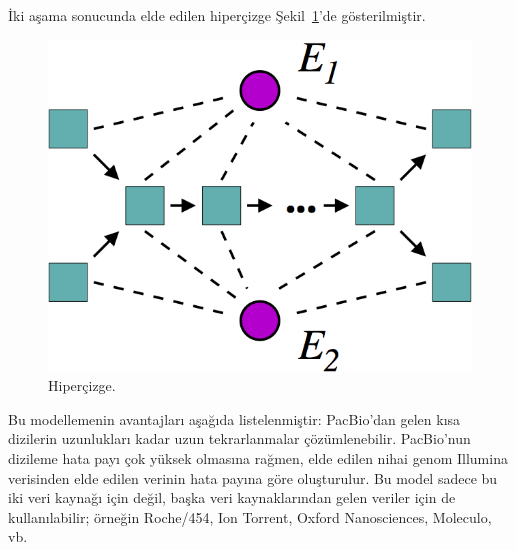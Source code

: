 İki aşama sonucunda elde edilen hiperçizge Şekil~\ref{fig:hypergraph}'de gösterilmiştir.

\begin{figure}[htb]
  \begin{center}
    \includegraphics[scale=0.4]{hypergraph.png}
  \end{center}
  \caption{Hiperçizge.}
  \label{fig:hypergraph}
\end{figure}



	Bu modellemenin avantajları aşağıda listelenmiştir:
PacBio'dan gelen kısa dizilerin uzunlukları kadar uzun tekrarlanmalar çözümlenebilir.
PacBio'nun dizileme hata payı çok yüksek olmasına rağmen, elde edilen nihai genom Illumina verisinden elde edilen verinin hata payına göre oluşturulur.
Bu model sadece bu iki veri kaynağı için değil, başka veri kaynaklarından gelen veriler için de kullanılabilir; örneğin Roche/454, Ion Torrent, Oxford Nanosciences, Moleculo, vb.
